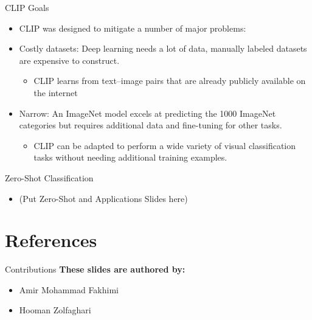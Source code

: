 \documentclass[serif, aspectratio=169]{beamer}
\begin{document}
\begin{frame}{CLIP Goals}
\begin{itemize}
\item CLIP was designed to mitigate a number of major problems:
\item Costly datasets: Deep learning needs a lot of data, manually labeled datasets are expensive to construct.
\begin{itemize}
\item CLIP learns from text–image pairs that are already publicly available on the internet
\end{itemize}
\item Narrow: An ImageNet model excels at predicting the 1000 ImageNet categories but requires additional data and fine-tuning for other tasks. 

\begin{itemize}
\item CLIP can be adapted to perform a wide variety of visual classification tasks without needing additional training examples. 
\end{itemize}
\end{itemize}

\end{frame}


\begin{frame}{Zero-Shot Classification}
\begin{itemize}
\item (Put Zero-Shot and Applications Slides here)
\end{itemize}
\end{frame}

\section{References}

\begin{frame}{Contributions}
\textbf{These slides are authored by:}
    \begin{itemize}
        \item Amir Mohammad Fakhimi
        \item Hooman Zolfaghari
    \end{itemize}
    
\end{frame}


\begin{frame}[allowframebreaks]
   \nocite{*} %
\end{frame}
\end{document}
